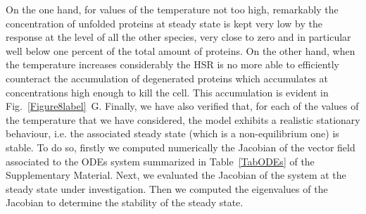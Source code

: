 \documentclass[oneside, 10pt, a4paper, twocolumn]{article}
\begin{document}
On the one hand, for values of the temperature not too high, remarkably the concentration of unfolded proteins at steady state is kept very low by the response at the level of all the other species, very close to zero and in particular well below one percent of the total amount of proteins. 
On the other hand, when the temperature increases considerably the HSR is no more able to efficiently counteract the accumulation of degenerated proteins which accumulates at concentrations high enough to kill the cell. This accumulation is evident in Fig.~\ref{Figure8label}~G. 
Finally, we have also verified 
that, for each of the values of the temperature that we have considered, the model exhibits a realistic stationary behaviour, i.e. the associated steady state (which is a non-equilibrium one) is stable. 
To do so, firstly we computed numerically the Jacobian of the vector field associated to the ODEs system summarized in Table~\ref{TabODEs} of the Supplementary Material. 
Next, we evaluated the Jacobian of the system at the steady state 
under investigation.
Then we computed the eigenvalues of the Jacobian to determine the stability of the steady state. 
\end{document}

